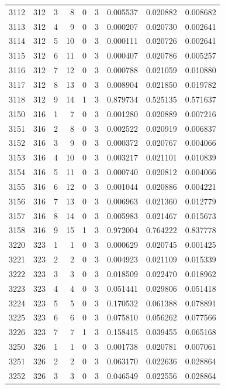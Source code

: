 \begin{longtable}{rrrrrrrrr}
3112 & 312 & 3 & 8 & 0 & 3 & 0.005537 & 0.020882 & 0.008682 \\
3113 & 312 & 4 & 9 & 0 & 3 & 0.000207 & 0.020730 & 0.002641 \\
3114 & 312 & 5 & 10 & 0 & 3 & 0.000111 & 0.020726 & 0.002641 \\
3115 & 312 & 6 & 11 & 0 & 3 & 0.000407 & 0.020786 & 0.005257 \\
3116 & 312 & 7 & 12 & 0 & 3 & 0.000788 & 0.021059 & 0.010880 \\
3117 & 312 & 8 & 13 & 0 & 3 & 0.008904 & 0.021850 & 0.019782 \\
3118 & 312 & 9 & 14 & 1 & 3 & 0.879734 & 0.525135 & 0.571637 \\
3150 & 316 & 1 & 7 & 0 & 3 & 0.001280 & 0.020889 & 0.007216 \\
3151 & 316 & 2 & 8 & 0 & 3 & 0.002522 & 0.020919 & 0.006837 \\
3152 & 316 & 3 & 9 & 0 & 3 & 0.000372 & 0.020767 & 0.004066 \\
3153 & 316 & 4 & 10 & 0 & 3 & 0.003217 & 0.021101 & 0.010839 \\
3154 & 316 & 5 & 11 & 0 & 3 & 0.000740 & 0.020812 & 0.004066 \\
3155 & 316 & 6 & 12 & 0 & 3 & 0.001044 & 0.020886 & 0.004221 \\
3156 & 316 & 7 & 13 & 0 & 3 & 0.006963 & 0.021360 & 0.012779 \\
3157 & 316 & 8 & 14 & 0 & 3 & 0.005983 & 0.021467 & 0.015673 \\
3158 & 316 & 9 & 15 & 1 & 3 & 0.972004 & 0.764222 & 0.837778 \\
3220 & 323 & 1 & 1 & 0 & 3 & 0.000629 & 0.020745 & 0.001425 \\
3221 & 323 & 2 & 2 & 0 & 3 & 0.004923 & 0.021109 & 0.015339 \\
3222 & 323 & 3 & 3 & 0 & 3 & 0.018509 & 0.022470 & 0.018962 \\
3223 & 323 & 4 & 4 & 0 & 3 & 0.051441 & 0.029806 & 0.051418 \\
3224 & 323 & 5 & 5 & 0 & 3 & 0.170532 & 0.061388 & 0.078891 \\
3225 & 323 & 6 & 6 & 0 & 3 & 0.075810 & 0.056262 & 0.077566 \\
3226 & 323 & 7 & 7 & 1 & 3 & 0.158415 & 0.039455 & 0.065168 \\
3250 & 326 & 1 & 1 & 0 & 3 & 0.001738 & 0.020781 & 0.007061 \\
3251 & 326 & 2 & 2 & 0 & 3 & 0.063170 & 0.022636 & 0.028864 \\
3252 & 326 & 3 & 3 & 0 & 3 & 0.046549 & 0.022556 & 0.028864 \\

\end{longtable}
